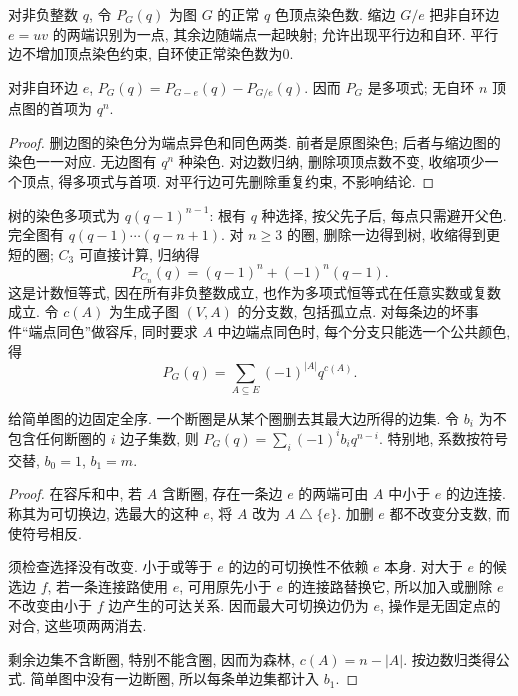 \label{ch:polynomials}
\begin{definition}
对非负整数 $q$, 令 $P_G(q)$ 为图 $G$ 的正常 $q$ 色顶点染色数. 缩边 $G/e$ 把非自环边 $e=uv$ 的两端识别为一点, 其余边随端点一起映射; 允许出现平行边和自环. 平行边不增加顶点染色约束, 自环使正常染色数为0.
\end{definition}
\begin{theorem}\label{thm:chromaticdel}
对非自环边 $e$, $P_G(q)=P_{G-e}(q)-P_{G/e}(q)$. 因而 $P_G$ 是多项式; 无自环 $n$ 顶点图的首项为 $q^n$.
\end{theorem}
\begin{proof}
删边图的染色分为端点异色和同色两类. 前者是原图染色; 后者与缩边图的染色一一对应. 无边图有 $q^n$ 种染色. 对边数归纳, 删除项顶点数不变, 收缩项少一个顶点, 得多项式与首项. 对平行边可先删除重复约束, 不影响结论.
\end{proof}
树的染色多项式为 $q(q-1)^{n-1}$: 根有 $q$ 种选择, 按父先子后, 每点只需避开父色. 完全图有 $q(q-1)\cdots(q-n+1)$. 对 $n\ge3$ 的圈, 删除一边得到树, 收缩得到更短的圈; $C_3$ 可直接计算, 归纳得
\[
P_{C_n}(q)=(q-1)^n+(-1)^n(q-1).
\]
这是计数恒等式, 因在所有非负整数成立, 也作为多项式恒等式在任意实数或复数成立.
令 $c(A)$ 为生成子图 $(V,A)$ 的分支数, 包括孤立点. 对每条边的坏事件“端点同色”做容斥, 同时要求 $A$ 中边端点同色时, 每个分支只能选一个公共颜色, 得
\begin{equation}\label{eq:chromaticsubset}
P_G(q)=\sum_{A\subseteq E}(-1)^{|A|}q^{c(A)}.
\end{equation}
\begin{theorem}\label{thm:nbc}
给简单图的边固定全序. 一个断圈是从某个圈删去其最大边所得的边集. 令 $b_i$ 为不包含任何断圈的 $i$ 边子集数, 则 $P_G(q)=\sum_i(-1)^i b_i q^{n-i}$. 特别地, 系数按符号交替, $b_0=1$, $b_1=m$.
\end{theorem}
\begin{proof}
在容斥和中, 若 $A$ 含断圈, 存在一条边 $e$ 的两端可由 $A$ 中小于 $e$ 的边连接. 称其为可切换边, 选最大的这种 $e$, 将 $A$ 改为 $A\mathbin\triangle\{e\}$. 加删 $e$ 都不改变分支数, 而使符号相反.

须检查选择没有改变. 小于或等于 $e$ 的边的可切换性不依赖 $e$ 本身. 对大于 $e$ 的候选边 $f$, 若一条连接路使用 $e$, 可用原先小于 $e$ 的连接路替换它, 所以加入或删除 $e$ 不改变由小于 $f$ 边产生的可达关系. 因而最大可切换边仍为 $e$, 操作是无固定点的对合, 这些项两两消去.

剩余边集不含断圈, 特别不能含圈, 因而为森林, $c(A)=n-|A|$. 按边数归类得公式. 简单图中没有一边断圈, 所以每条单边集都计入 $b_1$.
\end{proof}
